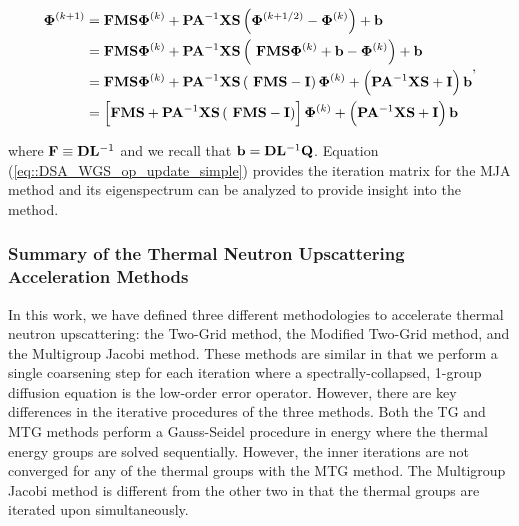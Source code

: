 \begin{equation}
\label{eq::DSA_WGS_op_update_simple}
\begin{aligned}
 {\bf \Phi}^{(k+1)} &=  {\bf F}  {\bf M} {\bf S} {\bf \Phi}^{(k)} +  {\bf P} {\bf A}^{-1}  {\bf X} {\bf S} \left(  {\bf \Phi}^{(k+1/2)} - {\bf \Phi}^{(k)}  \right) + {\bf b} \\
&= {\bf F}  {\bf M} {\bf S} {\bf \Phi}^{(k)} +  {\bf P} {\bf A}^{-1}  {\bf X} {\bf S} \left(  \ {\bf F}  {\bf M} {\bf S} {\bf \Phi}^{(k)} + {\bf b} - {\bf \Phi}^{(k)}  \right) + {\bf b} \\
&= {\bf F}  {\bf M} {\bf S} {\bf \Phi}^{(k)} +  {\bf P} {\bf A}^{-1}  {\bf X} {\bf S} \left(  \ {\bf F}  {\bf M} {\bf S}  -  {\bf I} \right){\bf \Phi}^{(k)} + \left(  {\bf P} {\bf A}^{-1}  {\bf X} {\bf S}  + {\bf I} \right) {\bf b} \\
&= \left[ {\bf F}  {\bf M} {\bf S} +  {\bf P} {\bf A}^{-1}  {\bf X} {\bf S} \left(  \ {\bf F}  {\bf M} {\bf S}  -  {\bf I} \right) \right] {\bf \Phi}^{(k)} + \left(  {\bf P} {\bf A}^{-1}  {\bf X} {\bf S}  + {\bf I} \right) {\bf b}
\end{aligned} ,
\end{equation}

\noindent where ${\bf F} \equiv {\bf D}{\bf L}^{-1} $ and we recall that ${\bf b} = {\bf D}{\bf L}^{-1}  {\bf Q}$. Equation (\ref{eq::DSA_WGS_op_update_simple}) provides the iteration matrix for the MJA method and its eigenspectrum can be analyzed to provide insight into the method.

\subsubsection{Summary of the Thermal Neutron Upscattering Acceleration Methods}
\label{sec:DSA_DSA_MG_Summary}

In this work, we have defined three different methodologies to accelerate thermal neutron upscattering: the Two-Grid method, the Modified Two-Grid method, and the Multigroup Jacobi method. These methods are similar in that we perform a single coarsening step for each iteration where a spectrally-collapsed, 1-group diffusion equation is the low-order error operator. However, there are key differences in the iterative procedures of the three methods. Both the TG and MTG methods perform a Gauss-Seidel procedure in energy where the thermal energy groups are solved sequentially. However, the inner iterations are not converged for any of the thermal groups with the MTG method. The Multigroup Jacobi method is different from the other two in that the thermal groups are iterated upon simultaneously. 

